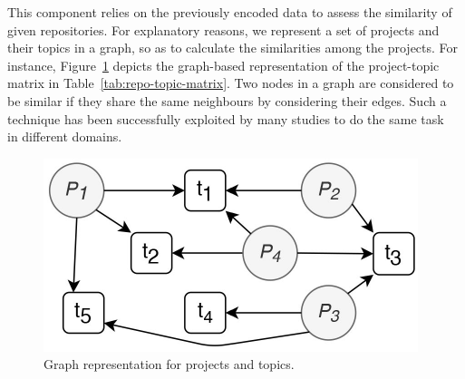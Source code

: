 This component relies on the previously encoded data to assess the similarity 
of given repositories. For explanatory reasons, we represent a set of projects 
and their topics in a graph, so as to calculate the similarities among the 
projects. For instance, Figure~\ref{fig:Graph} depicts the graph-based 
representation of the project-topic matrix in Table~\ref{tab:repo-topic-matrix}.  
%
Two nodes in a graph are considered to be similar if they share the same 
neighbours by considering their edges. Such a technique has been successfully 
exploited by many studies to do the same task~\cite{BRIGUEZ20146467} in 
different domains.


\begin{figure}[h!]
	\centering
	\includegraphics[width=0.8\columnwidth]{figs/graphCFtop.pdf}
	\caption{Graph representation for projects and topics.}
	\label{fig:Graph}
\end{figure}

